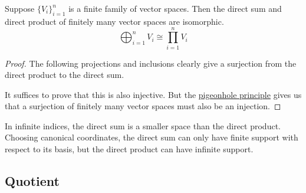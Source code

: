 \begin{theorem}
    Suppose \({\{V_i\}}_{i=1}^n\) is a finite family of vector spaces.
    Then the direct sum and direct product of finitely many vector spaces are isomorphic.
    \begin{equation*}
        \bigoplus_{i=1}^n V_i \cong \prod_{i=1}^n V_i
    \end{equation*}
\end{theorem}
\begin{proof}
    The following projections and inclusions clearly give a surjection
    from the direct product to the direct sum.
    \begin{center}
    \end{center}
    It suffices to prove that this is also injective.
    But the \hyperref[thm:pigeonhole]{pigeonhole principle}
    gives us that a surjection of finitely many vector spaces
    must also be an injection.
\end{proof}

\begin{remark}
    In infinite indices,
    the direct sum is a smaller space than the direct product.
    Choosing canonical coordinates,
    the direct sum can only have finite support with respect to its basis,
    but the direct product can have infinite support.
\end{remark}


\subsection{Quotient}

